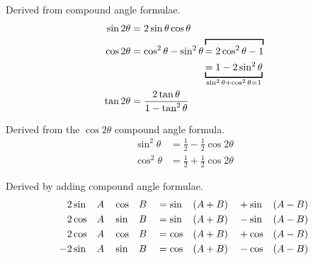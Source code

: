 \begin{multicols}{2}

    \MulticolsBreak

    \begin{CheatsheetEntryFrame}


        Derived from compound angle formulae.
        \begin{align*}
            \sin{2 \theta} &= 2 \sin{\theta} \cos{\theta} \\
            \cos{2 \theta} &= \cos^2{\theta} - \sin^2{\theta}  \overbracket[1pt][1.75mm]{= 2 \cos^2{\theta} - 1} \\
                &\phantom{{}= \cos^2{\theta} - \sin^2{\theta}} \underbracket[1pt][1.75mm]{= 1 - 2 \sin^2{\theta}}_{
                        \sin^2{\theta} + \cos^2{\theta} = 1
                }\\
            \tan{2 \theta} &= \frac{2 \tan{\theta}}{1 - \tan^2{\theta}}
        \end{align*}


        Derived from the $\cos{2 \theta}$ compound angle formula.
        \begin{align*}
            \sin^2{\theta} &= \frac{1}{2} - \frac{1}{2} \cos{2 \theta} \\
            \cos^2{\theta} &= \frac{1}{2} + \frac{1}{2} \cos{2 \theta}
        \end{align*}


        Derived by adding compound angle formulae.
        \begin{alignat*}{8}
             &2 \sin&&{A} && \cos&&{B} &&= \sin&&{\parens*{A+B}} &&+ \sin&&{\parens*{A-B}} \\
             &2 \cos&&{A} && \sin&&{B} &&= \sin&&{\parens*{A+B}} &&- \sin&&{\parens*{A-B}} \\
             &2 \cos&&{A} && \cos&&{B} &&= \cos&&{\parens*{A+B}} &&+ \cos&&{\parens*{A-B}} \\
            -&2 \sin&&{A} && \sin&&{B} &&= \cos&&{\parens*{A+B}} &&- \cos&&{\parens*{A-B}}
        \end{alignat*}


\end{CheatsheetEntryFrame}
\end{multicols}
